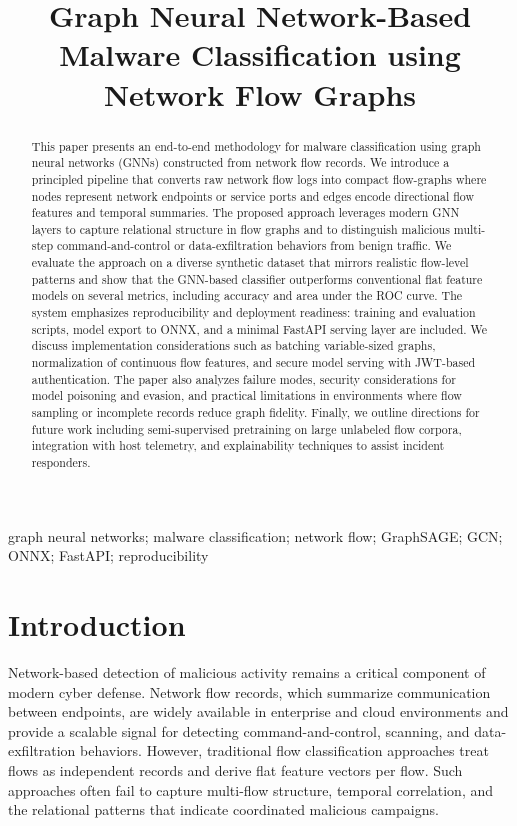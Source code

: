 \documentclass[conference]{IEEEtran}
\title{Graph Neural Network-Based Malware Classification using Network Flow Graphs}
\author{\IEEEauthorblockN{Author Name}
\IEEEauthorblockA{Institution / Department \\ email@example.com}
}
\begin{document}
\maketitle

\begin{abstract}
This paper presents an end-to-end methodology for malware classification using graph neural networks (GNNs) constructed from network flow records. We introduce a principled pipeline that converts raw network flow logs into compact flow-graphs where nodes represent network endpoints or service ports and edges encode directional flow features and temporal summaries. The proposed approach leverages modern GNN layers to capture relational structure in flow graphs and to distinguish malicious multi-step command-and-control or data-exfiltration behaviors from benign traffic. We evaluate the approach on a diverse synthetic dataset that mirrors realistic flow-level patterns and show that the GNN-based classifier outperforms conventional flat feature models on several metrics, including accuracy and area under the ROC curve. The system emphasizes reproducibility and deployment readiness: training and evaluation scripts, model export to ONNX, and a minimal FastAPI serving layer are included. We discuss implementation considerations such as batching variable-sized graphs, normalization of continuous flow features, and secure model serving with JWT-based authentication. The paper also analyzes failure modes, security considerations for model poisoning and evasion, and practical limitations in environments where flow sampling or incomplete records reduce graph fidelity. Finally, we outline directions for future work including semi-supervised pretraining on large unlabeled flow corpora, integration with host telemetry, and explainability techniques to assist incident responders.
\end{abstract}

\begin{IEEEkeywords}
graph neural networks; malware classification; network flow; GraphSAGE; GCN; ONNX; FastAPI; reproducibility
\end{IEEEkeywords}


\section{Introduction}

Network-based detection of malicious activity remains a critical component of modern cyber defense. Network flow records, which summarize communication between endpoints, are widely available in enterprise and cloud environments and provide a scalable signal for detecting command-and-control, scanning, and data-exfiltration behaviors. However, traditional flow classification approaches treat flows as independent records and derive flat feature vectors per flow. Such approaches often fail to capture multi-flow structure, temporal correlation, and the relational patterns that indicate coordinated malicious campaigns.
\end{document}
